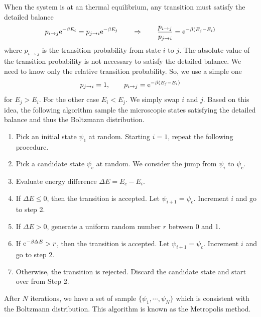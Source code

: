 When the system is at an thermal equilibrium, any transition must satisfy the detailed balance\cite{detailed_balance}
\begin{equation}
p_{i \rightarrow j} \text{e}^{-\beta E_i} = p_{j \rightarrow i} \text{e}^{-\beta E_j} \qquad \Rightarrow \qquad \frac{p_{i \rightarrow j}}{p_{j \rightarrow i}}= \text{e}^{-\beta (E_j-E_i)}
\end{equation}
where $p_{i \rightarrow j}$ is the transition probability from state $i$ to $j$.  The absolute value of the transition probability is not necessary to satisfy the detailed balance.  We need to know only the relative transition probability.  So, we use a simple one
\begin{equation}
p_{j \rightarrow i} = 1, \qquad p_{i \rightarrow j}=\text{e}^{-\beta (E_j-E_i)}
\end{equation}
for $E_j>E_i$.  For the other case $E_i<E_j$.  We simply swap $i$ and $j$.   Based on this idea, the following algorithm sample the microscopic states satisfying the detailed balance and thus the Boltzmann distribution.

\bigskip
\begin{myalgobox}
\label{algo:metropolis}

\medskip
\begin{minipage}{5.5in}
\small
\begin{enumerate}
\item Pick an initial state $\psi_1$ at random.  Starting $i=1$, repeat the following procedure.
\item Pick a candidate state $\psi_\text{c} $ at random. We consider the jump from $\psi_i$ to $\psi_\text{c}$.
\item Evaluate energy difference $\Delta E=E_{c}-E_{i}$.
\item If $\Delta E \le 0$, then the transition is accepted. Let $\psi_{i+1}=\psi_{c}$.  Increment $i$ and go to step 2.
\item If $\Delta E > 0$, generate a uniform random number $r$  between 0 and 1.
\item If $\text{e}^{-\beta \Delta E} > r$, then the transition is accepted.  Let $\psi_{i+1}=\psi_{c}$.  Increment $i$ and go to step 2.
\item Otherwise, the transition is rejected.  Discard the candidate state and start over from Step 2.
\end{enumerate}
After $N$ iterations, we have a set of sample $\{\psi_1, \cdots, \psi_N\}$ which is consistent with the Boltzmann distribution.  This algorithm is known as the Metropolis method.
\end{minipage}
\end{myalgobox}


